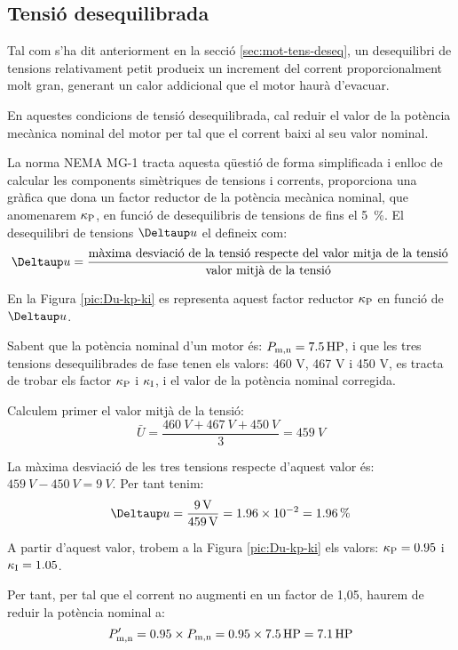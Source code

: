 \subsection{Tensió desequilibrada}\label{sec:NEMA-U-deseq}

Tal com s'ha dit anteriorment en la secció \ref{sec:mot-tens-deseq}, un desequilibri de tensions relativament petit produeix un increment del corrent proporcionalment molt gran, generant un  calor addicional que el motor haurà d'evacuar.

En aquestes condicions de tensió desequilibrada, cal reduir el valor de la potència mecànica nominal del motor per tal que el corrent baixi al seu valor nominal.

La norma NEMA MG-1 tracta aquesta qüestió de forma simplificada i enlloc de calcular les components simètriques de tensions i corrents, proporciona una gràfica que dona un factor reductor de la potència mecànica nominal, que anomenarem $\kappa_\mathrm{P}$, en funció de desequilibris de tensions de fins el \SI{5}{\%}. El desequilibri de tensions $\Deltaup u$ el defineix com:
\[
    \Deltaup u = \frac{\text{màxima desviació de la tensió respecte del valor mitja de la tensió}}{\text{valor mitjà de la tensió}}
\]

En la Figura \vref{pic:Du-kp-ki} es representa aquest factor reductor $\kappa_\mathrm{P}$ en funció de $\Deltaup u$.

\begin{center}
    
    \label{pic:Du-kp-ki}
\end{center}


\begin{exemple}
    Sabent que la  potència nominal d'un motor és: $P_\mathrm{m,n} = \SI{7,5}{HP}$, i que les tres tensions desequilibrades  de fase tenen els valors: 460 V, 467 V i 450 V, es tracta de trobar els factor $\kappa_\mathrm{P}$ i  $\kappa_\mathrm{I}$, i el valor de la potència nominal corregida.

    Calculem primer el valor mitjà de la tensió:
    \[
      \bar{U} = \frac{\SI{460}{V}+\SI{467}{V}+\SI{450}{V}}{3} = \SI{459}{V}
    \]

    La màxima desviació de les tres tensions respecte d'aquest valor és: $\SI{459}{V}-\SI{450}{V} = \SI{9}{V}$. Per tant tenim:
    \[
        \Deltaup u = \frac{\SI{9}{V}}{\SI{459}{V}} = \num{1,96e-2} = \SI{1,96}{\%}
    \]

     A partir d'aquest valor, trobem a la Figura \vref{pic:Du-kp-ki} els valors:  $\kappa_\mathrm{P} = \num{0,95}$ i  $\kappa_\mathrm{I}=\num{1,05}$.

     Per tant, per tal que el corrent no augmenti en un factor de 1,05, haurem de reduir la potència nominal a:
     \[
         P'_\mathrm{m,n} = \num{0,95}\times{}P_\mathrm{m,n}  = \num{0,95}\times\SI{7,5}{HP} = \SI{7,1}{HP}
     \]
\end{exemple}

